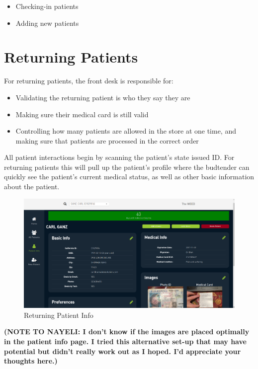 \documentclass[]{book}
\theoremstyle{definition}
\theoremstyle{definition}
\theoremstyle{definition}
\theoremstyle{remark}
\begin{document}
\begin{itemize}
\item
  Checking-in patients
\item
  Adding new patients
\end{itemize}

\section{Returning Patients}\label{returning-patients}

For returning patients, the front desk is responsible for:

\begin{itemize}
\item
  Validating the returning patient is who they say they are
\item
  Making sure their medical card is still valid
\item
  Controlling how many patients are allowed in the store at one time,
  and making sure that patients are processed in the correct order
\end{itemize}

All patient interactions begin by scanning the patient's state issued
ID. For returning patients this will pull up the patient's profile where
the budtender can quickly see the patient's current medical status, as
well as other basic information about the patient.

\begin{figure}
\centering
\includegraphics{images/FD1.png}
\caption{Returning Patient Info}
\end{figure}

\textbf{(NOTE TO NAYELI: I don't know if the images are placed optimally
in the patient info page. I tried this alternative set-up that may have
potential but didn't really work out as I hoped. I'd appreciate your
thoughts here.)}
\end{document}
